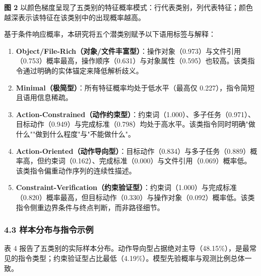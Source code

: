 \documentclass[12pt,a4paper,openany,oneside]{ctexrep}
\begin{document}
\textbf{图 2} 以颜色梯度呈现了五类别的特征概率模式：行代表类别，列代表特征；颜色越深表示该特征在该类别中的出现概率越高。

基于条件响应概率，本研究将五个潜类别赋予以下语用标签与解释：

\begin{enumerate}
\item[1.] \textbf{Object/File-Rich（对象/文件丰富型）}：操作对象（0.973）与文件引用（0.753）概率最高，操作顺序（0.631）与对象属性（0.595）也较高。该类指令通过明确的实体锚定来降低解析歧义。
\item[2.] \textbf{Minimal（极简型）}：所有特征概率均处于低水平（最高仅 0.227），指令简短且语用信息稀疏。
\item[3.] \textbf{Action-Constrained（动作约束型）}：约束词（1.000）、多子任务（0.971）、目标动作（0.949）与完成标准（0.798）均处于高水平。该类指令同时明确"做什么""做到什么程度"与"不能做什么"。
\item[4.] \textbf{Action-Oriented（动作导向型）}：目标动作（0.834）与多子任务（0.889）概率高，但约束词（0.162）、完成标准（0.000）与文件引用（0.069）概率低。该类指令偏重动作序列的连续性描述。
\item[5.] \textbf{Constraint-Verification（约束验证型）}：约束词（1.000）与完成标准（0.820）概率最高，但目标动作（0.330）与操作对象（0.092）概率低。该类指令侧重边界条件与终点判断，而非路径细节。
\end{enumerate}


\subsubsection{4.3 样本分布与指令示例}


表 4 报告了五类别的实际样本分布。动作导向型占据绝对主导（48.15\%），是最常见的指令类型；约束验证型占比最低（4.19\%）。模型先验概率与观测比例总体一致。


\begin{table}[htbp]
\centering
\caption{表 4：潜在类别样本分布}
\small
{}
\end{table}
\end{document}
